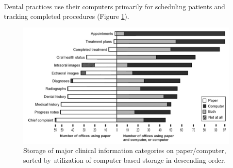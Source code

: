 \documentclass[11pt]{article}
\begin{document}
Dental practices use their computers primarily for scheduling patients and tracking completed procedures (Figure \ref{use}).\label{fig:4}
\begin{figure}[h]
\begin{center}
\includegraphics[width=\textwidth]{papervscomp.jpg}
\end{center}
\caption{Storage of major clinical information categories on paper/computer, sorted by utilization of computer-based storage in descending order\cite{Schleyer2007A-Qualitative-I}.}
\label{use}
\end{figure}
\end{document}
